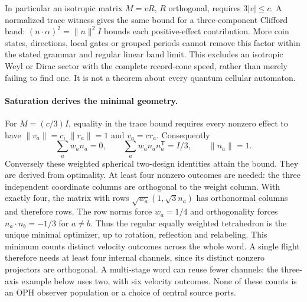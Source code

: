 In particular an isotropic matrix $M=vR$, $R$ orthogonal, requires
$3|v|\leq c$. A normalized trace witness gives the same bound for a
three-component Clifford band: $(n\cdot\alpha)^2=\|n\|^2I$ bounds
each positive-effect contribution. More coin states, directions, local gates
or grouped periods cannot remove this factor within the stated grammar and
regular linear band limit. This excludes an isotropic Weyl or Dirac sector
with the complete record-cone speed, rather than merely failing to find one.
It is not a theorem about every quantum cellular automaton.

\paragraph{Saturation derives the minimal geometry.}
For $M=(c/3)I$, equality in the trace bound requires every nonzero effect
to have $\|v_a\|=c$, $\|r_a\|=1$ and $v_a=cr_a$. Consequently
\[
 \sum_a w_an_a=0,\qquad
 \sum_a w_an_an_a^{\mathsf T}=I/3,\qquad \|n_a\|=1.
 \tag{QT1a}
\]
Conversely these weighted spherical two-design identities attain the bound.
They are derived from optimality. At least four nonzero outcomes are needed:
the three independent coordinate columns are orthogonal to the weight
column. With exactly four, the matrix with rows
$\sqrt{w_a}(1,\sqrt3 n_a)$ has orthonormal columns and therefore rows.
The row norms force $w_a=1/4$ and orthogonality forces
$n_a\cdot n_b=-1/3$ for $a\ne b$. Thus the regular equally weighted
tetrahedron is the unique minimal optimizer, up to rotation, reflection and relabeling.
This minimum counts distinct velocity outcomes across the whole word.
A single flight therefore needs at least four internal channels, since
its distinct nonzero projectors are orthogonal. A multi-stage word can
reuse fewer channels: the three-axis example below uses two, with six
velocity outcomes. None of these counts is an OPH observer population or
a choice of central source ports.

